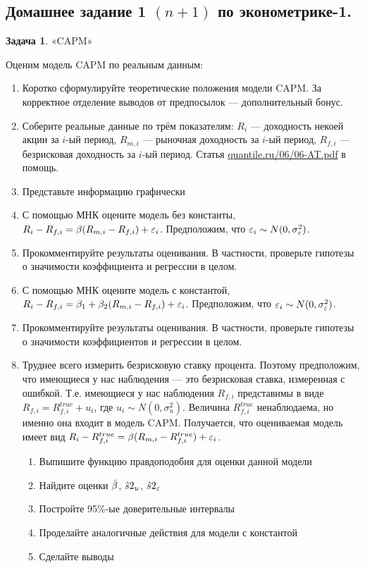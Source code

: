 \documentclass[12pt, a4paper]{article}\usepackage[]{graphicx}\usepackage[]{color}
\begin{document}
\subsection{Домашнее задание 1 $(n+1)$ по эконометрике-1.}

\textbf{Задача 1}. «CAPM»

Оценим модель CAPM по реальным данным:
\begin{enumerate}
\item Коротко сформулируйте теоретические положения модели CAPM. За корректное отделение выводов от предпосылок — дополнительный бонус.
\item Соберите реальные данные по трём показателям: $R_i$ — доходность некоей акции за $i$-ый период, $R_{m,i}$ — рыночная доходность за $i$-ый период, $R_{f,i}$ — безрисковая доходность за $i$-ый период. Статья \href{http://quantile.ru/06/06-AT.pdf}{quantile.ru/06/06-AT.pdf} в помощь.
\item Представьте информацию графически
\item С помощью МНК оцените модель без константы, $R_i-R_{f,i}=\beta (R_{m,i}-R_{f,i})+\varepsilon_i$. Предположим, что $\varepsilon_i \sim N(0,\sigma_{\varepsilon}^2)$.
\item Прокомментируйте результаты оценивания. В частности, проверьте гипотезы о значимости коэффициента и регрессии в целом.
\item С помощью МНК оцените модель с константой, $R_i-R_{f,i}=\beta_1 + \beta_2 (R_{m,i}-R_{f,i})+\varepsilon_i$. Предположим, что $\varepsilon_i \sim N(0,\sigma_{\varepsilon}^2)$.
\item Прокомментируйте результаты оценивания. В частности, проверьте гипотезы о значимости коэффициентов и регрессии в целом.
\item Труднее всего измерить безрисковую ставку процента. Поэтому предположим, что имеющиеся у нас наблюдения — это безрисковая ставка, измеренная с ошибкой. Т.е. имеющиеся у нас наблюдения $R_{f,i}$ представимы в виде $R_{f,i}=R_{f,i}^{true}+u_i$, где $u_i \sim N(0,\sigma^2_u)$. Величина $R_{f,i}^{true}$ ненаблюдаема, но именно она входит в модель CAPM. Получается, что оцениваемая модель имеет вид $R_i-R_{f,i}^{true}=\beta (R_{m,i}-R_{f,i}^{true})+\varepsilon_i$.
\begin{enumerate}
\item Выпишите функцию правдоподобия для оценки данной модели
\item Найдите оценки $\hat{\beta}$, $\hat{s}2_{u}$, $\hat{s}2_{\varepsilon}$
\item Постройте 95\%-ые доверительные интервалы
\item Проделайте аналогичные действия для модели с константой
\item Сделайте выводы
\end{enumerate}

\end{enumerate}
\end{document}
